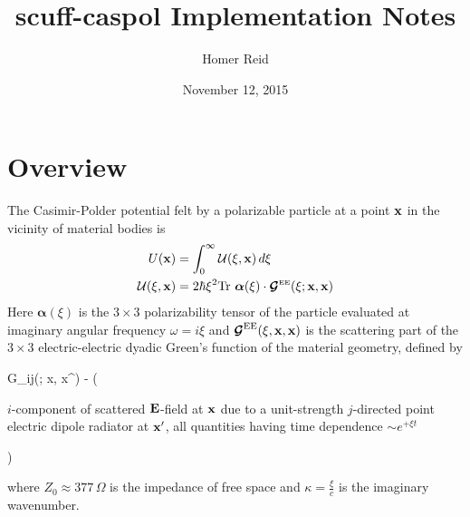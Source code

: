 \documentclass[letterpaper]{article}
\title {{\sc scuff-caspol} Implementation Notes}
\author {Homer Reid}
\date {November 12, 2015}
\begin{document}
\pagestyle{myheadings}
\maketitle

\tableofcontents

\section{Overview}
\newcommand{\vbAlpha}{\boldsymbol{\alpha}}
\newcommand{\vbGamma}{\boldsymbol{\Gamma}}

The Casimir-Polder potential felt by a polarizable
particle at a point $\mathbf{x}$ in the vicinity of material
bodies is 
\begin{subequations}
\begin{align}
U(\vb x) &= \int_0^\infty  \mc U(\xi, \vb x) \, d\xi
\\
\mc U(\xi, \vb x) 
 &= 2\hbar \xi^2
    \text{Tr }\vbAlpha(\xi) \cdot \bmc G\supt{EE}(\xi; \vb x, \vb x)
\end{align}
\label{CPP}
\end{subequations}
Here $\vbAlpha(\xi)$ is the $3\times 3$ polarizability tensor
of the particle evaluated at imaginary angular frequency $\omega=i\xi$
and $\boldsymbol{\mathcal{G}}^{\hbox{\scriptsize{EE}}}(\xi, \mathbf{x}, \mathbf{x})$ is the scattering part
of the $3\times 3$ electric-electric dyadic Green's function of 
the material geometry, defined by
{
 \mc G_{ij}(\xi; \vb x, \vb x^\prime)
   \equiv
  -
   \left( \quad
   \parbox{0.65\textwidth}
    { $i$-component of scattered $\mathbf{E}$-field at $\mathbf{x}$
      due to a unit-strength $j$-directed point electric
      dipole radiator
      at $\mathbf{x}^\prime$, all quantities having time dependence
      $\sim e^{+\xi t}$
    }
   \quad \right)
}
where $Z_0\approx 377\,\Omega$ is the impedance of free
space and $\kappa = \frac{\xi}{c}$ is the imaginary wavenumber.
\end{document}
